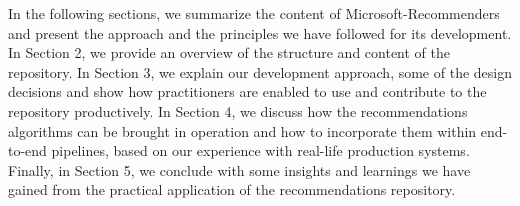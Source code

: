 In the following sections, we summarize the content of Microsoft-Recommenders and present the approach and the principles we have followed
for its development. In Section 2, we provide an overview of the structure and content of the repository. In Section 3, we explain our development approach, some of
the design decisions and show how practitioners are enabled to use and contribute to the repository productively. In Section 4, we discuss how the recommendations
algorithms can be brought in operation and how to incorporate them within end-to-end pipelines, based on our experience with real-life production systems. 
Finally, in Section 5, we conclude with some insights and learnings we have gained from the practical application of the recommendations repository.

